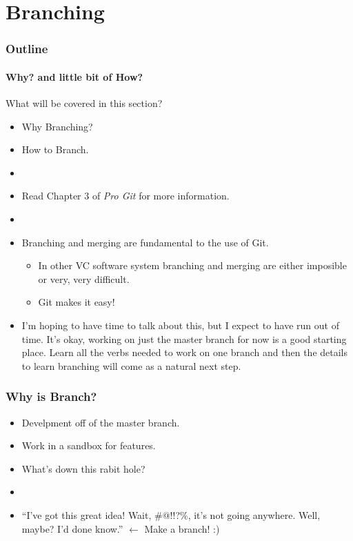 \section{Branching}

\begin{frame}[t]
  \frametitle{Outline}
  \framesubtitle{Why? and little bit of How?}
\end{frame}

\begin{frame}[t]{What will be covered in this section?}
  \begin{itemize}
    \item Why Branching?
    \item How to Branch.
    \item[]
    \item Read Chapter 3 of {\it Pro Git} for more information.
    \item[]
    \item Branching and merging are fundamental to the use of Git.  
      \begin{itemize}
        \item In other VC software system branching and merging are either
          imposible or very, very difficult.
        \item Git makes it easy!
      \end{itemize}

    \item I'm hoping to have time to talk about this, but I expect to have run
      out of time.  It's okay, working on just the master branch for now is a
      good starting place.  Learn all the verbs needed to work on one branch and
      then the details to learn branching will come as a natural next step.
  \end{itemize}
\end{frame}

\begin{frame}[t]
  \frametitle{Why is Branch?}
  \begin{itemize}
    \item Develpment off of the master branch.
    \item Work in a sandbox for features.
    \item What's down this rabit hole?
    \item[]
    \item ``I've got this great idea!  Wait, \#$@$!!?\%, it's not going
      anywhere.  Well, maybe?  I'd done know.'' $\leftarrow$ Make a branch! :)
  \end{itemize}
\end{frame}

